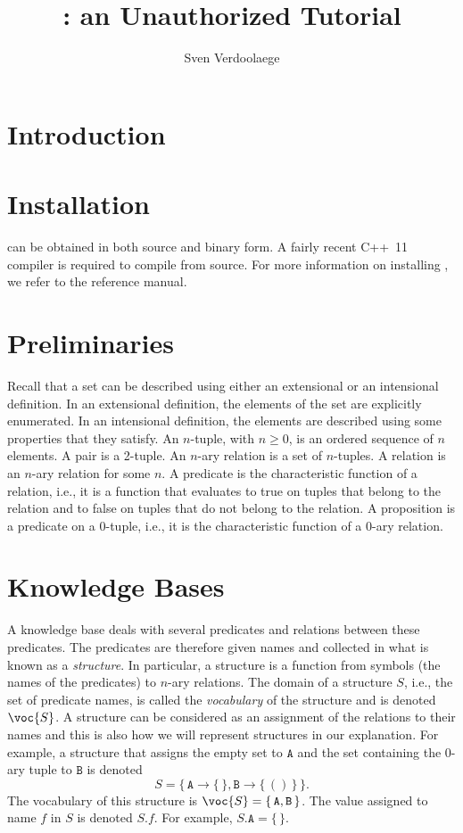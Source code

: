 \documentclass{article}
\begin{document}
\title{\idp: an Unauthorized Tutorial}
\author{Sven Verdoolaege}
\maketitle

\section{Introduction}

\section{Installation}

\idp can be obtained in both source and binary form.
A fairly recent \mbox{C++ 11} compiler is required to compile \idp from source.
For more information on installing \idp, we refer to the reference manual.

\section{Preliminaries}

Recall that a set can be described using either an extensional
or an intensional definition.  In an extensional definition,
the elements of the set are explicitly enumerated.
In an intensional definition, the elements are described
using some properties that they satisfy.
An $n$-tuple, with $n \ge 0$, is an ordered sequence of $n$ elements.
A pair is a 2-tuple.
An $n$-ary relation is a set of $n$-tuples.
A relation is an $n$-ary relation for some $n$.
A predicate is the characteristic function of a relation,
i.e., it is a function that evaluates to true on tuples that belong
to the relation and to false on tuples that do not belong
to the relation.
A proposition is a predicate on a $0$-tuple, i.e.,
it is the characteristic function of a $0$-ary relation.

\section{Knowledge Bases}

A knowledge base deals with several predicates and relations between
these predicates.
The predicates are therefore given names and collected in what
is known as a \emph{structure}.
In particular, a structure is a function from symbols (the names
of the predicates) to $n$-ary relations.
The domain of a structure $S$, i.e., the set of predicate names,
is called the \emph{vocabulary} of the structure and is denoted
$\voc{S}$.  A structure can be considered as an assignment
of the relations to their names and this is also how we will
represent structures in our explanation.
For example, a structure that assigns the empty set to $\mathtt{A}$
and the set containing the $0$-ary tuple to $\mathtt{B}$ is denoted
$$
S =
\{\,
\mathtt{A} \to \{\,\},
\mathtt{B} \to \{\, () \,\}
\,\}
.
$$
The vocabulary of this structure is
$\voc{S} = \{\, \mathtt{A}, \mathtt{B} \,\}$.
The value assigned to name $f$ in $S$ is denoted $S.f$.
For example, $S.\mathtt{A} = \{\,\}$.
\end{document}
